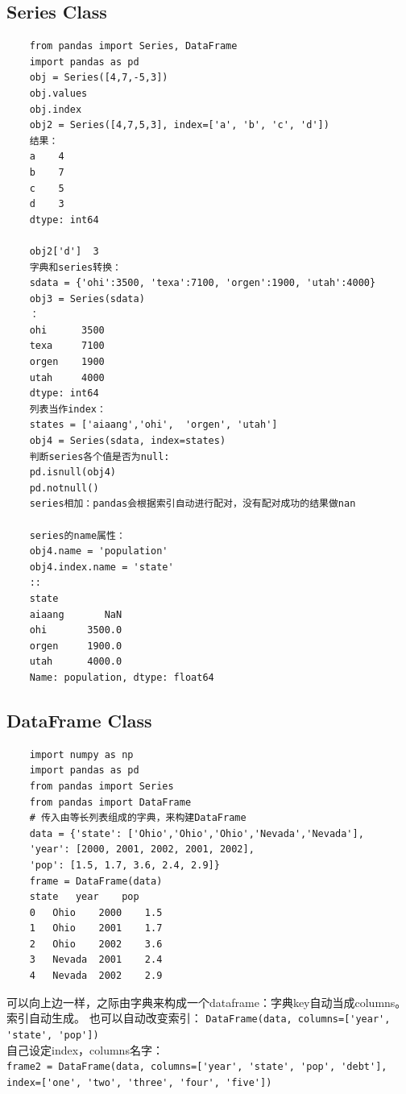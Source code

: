 \documentclass{article}
\begin{document}
\subsection{Series Class}
\begin{lstlisting}
	from pandas import Series, DataFrame
	import pandas as pd
	obj = Series([4,7,-5,3])
	obj.values
	obj.index
	obj2 = Series([4,7,5,3], index=['a', 'b', 'c', 'd'])
	结果：
	a    4
	b    7
	c    5
	d    3
	dtype: int64
	
	obj2['d']  3
	字典和series转换：
	sdata = {'ohi':3500, 'texa':7100, 'orgen':1900, 'utah':4000}
	obj3 = Series(sdata)
	：
	ohi      3500
	texa     7100
	orgen    1900
	utah     4000
	dtype: int64
	列表当作index：
	states = ['aiaang','ohi',  'orgen', 'utah']
	obj4 = Series(sdata, index=states)
	判断series各个值是否为null:
	pd.isnull(obj4)
	pd.notnull()
	series相加：pandas会根据索引自动进行配对，没有配对成功的结果做nan
	
	series的name属性：
	obj4.name = 'population'
	obj4.index.name = 'state'
	::
	state
	aiaang       NaN
	ohi       3500.0
	orgen     1900.0
	utah      4000.0
	Name: population, dtype: float64
\end{lstlisting}

\subsection{DataFrame Class}
\begin{lstlisting}
	import numpy as np
	import pandas as pd
	from pandas import Series
	from pandas import DataFrame
	# 传入由等长列表组成的字典，来构建DataFrame
	data = {'state': ['Ohio','Ohio','Ohio','Nevada','Nevada'],
	'year': [2000, 2001, 2002, 2001, 2002],
	'pop': [1.5, 1.7, 3.6, 2.4, 2.9]}
	frame = DataFrame(data)
	state	year	pop
	0	Ohio	2000	1.5
	1	Ohio	2001	1.7
	2	Ohio	2002	3.6
	3	Nevada	2001	2.4
	4	Nevada	2002	2.9
\end{lstlisting}
可以向上边一样，之际由字典来构成一个dataframe：字典key自动当成columns。
索引自动生成。
也可以自动改变索引：
\lstinline|DataFrame(data, columns=['year', 'state', 'pop'])|	\\
自己设定index，columns名字：\\
\lstinline|frame2 = DataFrame(data, columns=['year', 'state', 'pop', 'debt'], index=['one', 'two', 'three', 'four', 'five'])|
\end{document}
